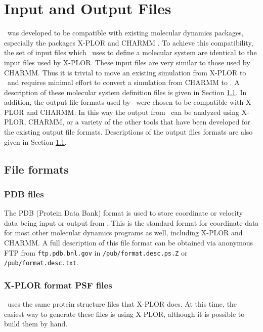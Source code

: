 \section{Input and Output Files}
\label{section:files}
\NAMD\ was developed to be compatible with existing 
molecular dynamics packages, 
especially the packages X-PLOR 
and CHARMM .  
To achieve this compatibility,
the set of input files which \NAMD\ uses to define 
a molecular system are identical to the input files used by X-PLOR.  
These input files are very similar to those used by CHARMM.  
Thus it is trivial to move an existing simulation from
X-PLOR to \NAMD\ and requires minimal effort to convert 
a simulation from CHARMM to \NAMD.  
A description of these molecular system definition 
files is given in Section \ref{section:formats}.  
\prettypar
In addition, the output file formats used by \NAMD\ 
were chosen to be compatible with X-PLOR and CHARMM.  
In this way the output from \NAMD\ can be analyzed using
X-PLOR, CHARMM, or a variety of the other tools that have 
been developed for the existing output file formats.  
Descriptions of the output files formats are also given in 
Section \ref{section:formats}.


\subsection{File formats}
\label{section:formats}

\subsubsection{PDB files}
The PDB (Protein Data Bank) format is used to store coordinate or velocity data 
being input or output from \NAMD.
This is the standard format for coordinate data
for most other molecular dynamics programs as well, including X-PLOR and CHARMM.
A full description of this file format can be obtained via anonymous FTP from
\verb!ftp.pdb.bnl.gov! in \verb!/pub/format.desc.ps.Z! or \verb!/pub/format.desc.txt!.

\subsubsection{X-PLOR format PSF files}

\NAMD\ uses the same protein structure files that X-PLOR does.
At this time, the
easiest way to generate these files is using X-PLOR, although it is possible
to build them by hand.

